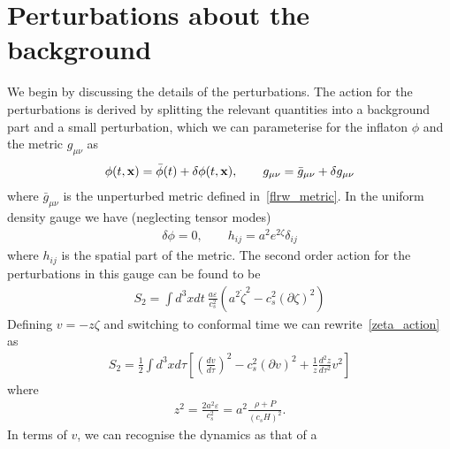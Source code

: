 \section{Perturbations about the background}
    We begin by discussing the details of the perturbations.
    The action for the perturbations is derived by
    splitting the relevant quantities into a background
    part and a small perturbation, which we can parameterise
    for the inflaton $\phi$ and the metric $g_{\mu\nu}$ as
    \begin{align}
        \phi(t,\mathbf{x})=\bar{\phi}(t)+\delta\phi(t,\mathbf{x}), \qquad g_{\mu\nu}=\bar{g}_{\mu\nu}+\delta g_{\mu\nu}
    \end{align}
    where $\bar{g}_{\mu\nu}$ is the unperturbed metric defined in~\eqref{flrw_metric}.
    In the uniform density gauge we have (neglecting tensor modes)
    \begin{align}
        \delta \phi=0, \qquad h_{ij}=a^2 e^{2\zeta} \delta_{ij}
    \end{align}
    where $h_{ij}$ is the spatial part of the metric.
    The second order action for the perturbations in this gauge can be found to be
    \begin{align}\label{zeta_action}
        S_{2} = \int d^3x dt~\frac{a\varepsilon}{c_s^2}\left(a^2\dot{\zeta}^2-c_s^2\left(\partial\zeta\right)^2\right)
    \end{align}
    Defining $v=-z\zeta$ and switching to conformal time we can rewrite~\eqref{zeta_action} as
    \begin{align}\label{v_action}
        S_{2} = \frac{1}{2}\int d^3x d\tau \left[{\left(\frac{d v}{d \tau}\right)}^2-c_s^2\left(\partial v\right)^2+\frac{1}{z}\frac{d^2z}{d\tau^2}v^2\right]
    \end{align}
    where
    \begin{align}\label{z_defn}
        z^2 = \frac{2a^2\varepsilon}{c_s^2} = a^2\frac{\rho+P}{\left(c_sH\right)^2}.
    \end{align}
    In terms of $v$, we can recognise the dynamics as that of a
